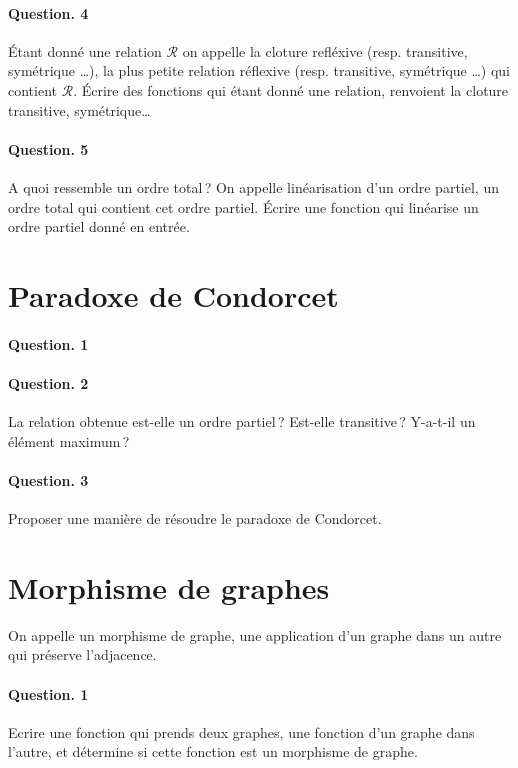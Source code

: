 \documentclass[10pt,a4paper]{article}
\begin{document}
\paragraph{Question. 4\\}
Étant donné une relation $\mathcal{R}$ on appelle la cloture refléxive (resp. transitive,
symétrique \dots), la plus petite relation réflexive (resp. transitive,
symétrique \dots) qui contient $\mathcal{R}$. Écrire des fonctions qui
étant donné une relation, renvoient la cloture transitive, symétrique\dots

\paragraph{Question. 5\\}
A quoi ressemble un ordre total\,? On appelle linéarisation d'un ordre
partiel, un ordre total qui contient cet ordre partiel. Écrire une
fonction qui linéarise un ordre partiel donné en entrée.
 
\section{Paradoxe de Condorcet}

\paragraph{Question. 1\\}

\paragraph{Question. 2\\}
La relation obtenue est-elle un ordre partiel\,? Est-elle transitive\,?
Y-a-t-il un élément maximum\,?

\paragraph{Question. 3\\}
Proposer une manière de résoudre le paradoxe de Condorcet.

\section{Morphisme de graphes}
On appelle un morphisme de graphe, une application d'un graphe dans un
autre qui préserve l'adjacence.

\paragraph{Question. 1\\} Ecrire une fonction qui prends deux graphes,
une fonction d'un graphe dans l'autre, et détermine si cette fonction est
un morphisme de graphe. 
\end{document}
